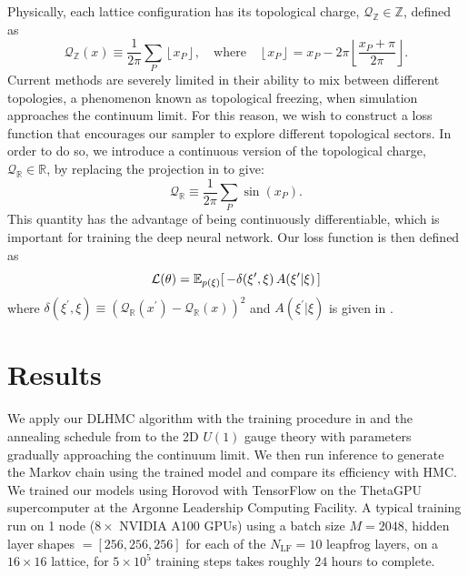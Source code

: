\documentclass{article} %
\begin{document}
Physically, each lattice configuration has its topological charge, \(\mathcal{Q}_{\mathbb{Z}}\in\mathbb{Z}\), defined as
%
\begin{equation}
      \mathcal{Q}_{\mathbb{Z}}(x) \equiv \frac{1}{2\pi}\sum_{P}\left\lfloor x_{P}\right\rfloor,
   \quad\text{where}\quad \left\lfloor x_{P}\right\rfloor = x_{P} -
   2\pi\left\lfloor\frac{x_{P}+\pi}{2\pi}\right\rfloor.
   \label{eq:intcharge}
\end{equation}
%
Current methods are severely limited in their ability to mix between different topologies, a phenomenon known as
topological freezing, when simulation approaches the continuum limit.
%
For this reason, we wish to construct a loss function that encourages our sampler to explore different topological sectors.
%
In order to do so, we introduce a continuous version of the topological charge,
\(\mathcal{Q}_{\mathbb{R}}\in\mathbb{R}\), by replacing the projection in  to give:
%
\begin{equation}
    \mathcal{Q}_{\mathbb{R}} \equiv \frac{1}{2\pi}\sum_{P}\sin(x_{P}).
    \label{eq:sincharge}
\end{equation}
%
This quantity has the advantage of being continuously differentiable, which is important for training the deep neural
network.
%
Our loss function is then defined as
%
\begin{equation}
   \mathcal{L}(\theta) = \mathbb{E}_{p(\xi)}{%
      \left[\,-\delta(\xi^{\prime}, \xi) \, A(\xi^{\prime}|\xi)\,\right]
   }
\end{equation}
%
where \(\delta(\xi^{\prime}, \xi) \equiv {\left(\mathcal{Q}_{\mathbb{R}}(x^{\prime}) -
\mathcal{Q}_{\mathbb{R}}(x)\right)}^{2}\) and \(A(\xi^{\prime}|\xi)\) is given in .
%
%
\section{\label{sec:results}Results}
%
We apply our DLHMC algorithm with
the training procedure in  and the annealing schedule from 
to the 2D $U(1)$ gauge theory with parameters gradually approaching the continuum limit.
%
We then run inference to generate the Markov chain using the trained model and compare its efficiency with HMC.\@
%
We trained our models using Horovod \citep{horovod2018sergeev} with TensorFlow \citep{tensorflow2015-whitepaper} on the
ThetaGPU supercomputer at the Argonne Leadership Computing Facility.
%
A typical training run on 1 node (\(8\times\) NVIDIA A100 GPUs) using a batch size \(M=2048\), hidden layer shapes
\(=\left[256, 256, 256\right]\) for each of the \(N_{\mathrm{LF}}=10\) leapfrog layers, on a \(16\times16\) lattice, for
\(5\times10^{5}\) training steps takes roughly \(24\) hours to complete.
%
\end{document}
